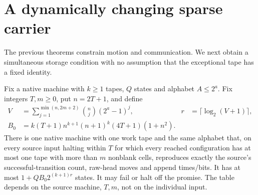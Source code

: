 \section{A dynamically changing sparse carrier}\label{sec:storage}

The previous theorems constrain motion and communication. We next obtain a
simultaneous storage condition with no assumption that the exceptional tape
has a fixed identity.

\begin{theorem}\label{thm:carrier}
\notformalized
Fix a native machine with $k\ge1$ tapes, $Q$ states and alphabet
$A\le2^a$. Fix integers $T,m\ge0$, put $n=2T+1$, and define
\begin{align*}
 V&=\sum_{j=1}^{\min(n,2m+2)}\binom nj(2^a-1)^j,
 &r&=\lceil\log_2(V+1)\rceil,\\
 B_0&=k(T+1)n^{k+1}(n+1)^k(4T+1)(1+n^2).
\end{align*}
There is one native machine with one work tape and the same alphabet that,
on every source input halting within $T$ for which every reached configuration
has at most one tape with more than $m$ nonblank cells, reproduces exactly the
source's successful-transition count, raw-head moves and append times/bits.
It has at most $1+QB_0 2^{(k+1)r}$ states. It may fail or halt off the promise.
The table depends on the source machine, $T,m$, not on the individual input.
\end{theorem}
